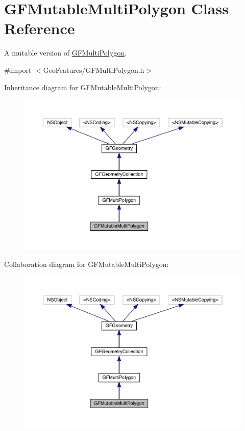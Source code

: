 \hypertarget{interface_g_f_mutable_multi_polygon}{}\section{G\+F\+Mutable\+Multi\+Polygon Class Reference}
\label{interface_g_f_mutable_multi_polygon}


A mutable version of \hyperlink{interface_g_f_multi_polygon}{G\+F\+Multi\+Polygon}.  




{\ttfamily \#import $<$Geo\+Features/\+G\+F\+Multi\+Polygon.\+h$>$}



Inheritance diagram for G\+F\+Mutable\+Multi\+Polygon\+:\nopagebreak
\begin{figure}[H]
\begin{center}
\leavevmode
\includegraphics[width=350pt]{interface_g_f_mutable_multi_polygon__inherit__graph}
\end{center}
\end{figure}


Collaboration diagram for G\+F\+Mutable\+Multi\+Polygon\+:\nopagebreak
\begin{figure}[H]
\begin{center}
\leavevmode
\includegraphics[width=350pt]{interface_g_f_mutable_multi_polygon__coll__graph}
\end{center}
\end{figure}
